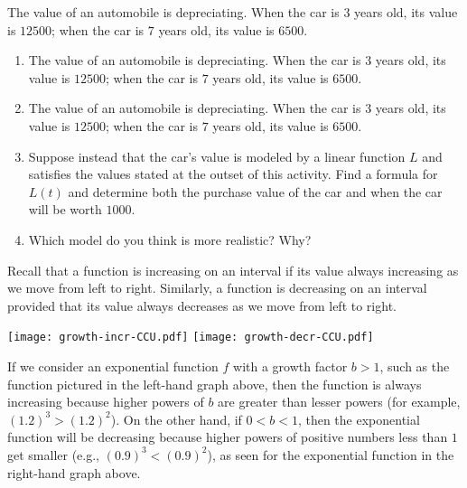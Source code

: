 \documentclass[nooutcomes]{ximera}
\begin{document}
\begin{exploration}
The value of an automobile is depreciating.  When the car is $3$ years old, its value is \textdollar{}$12500$; when the car is $7$ years old, its value is \textdollar{}$6500$.

\begin{enumerate}[label=\alph*.]
\item The value of an automobile is depreciating.  When the car is $3$ years old, its value is \textdollar{}$12500$; when the car is $7$ years old, its value is \textdollar{}$6500$.
\item The value of an automobile is depreciating.  When the car is $3$ years old, its value is \textdollar{}$12500$; when the car is $7$ years old, its value is \textdollar{}$6500$.
\item Suppose instead that the car's value is modeled by a linear function $L$ and satisfies the values stated at the outset of this activity.  Find a formula for $L(t)$ and determine both the purchase value of the car and when the car will be worth \textdollar{}$1000$.
\item Which model do you think is more realistic?  Why?
\end{enumerate}
\end{exploration}


Recall that a function is increasing on an interval if its value always increasing as we move from left to right.  Similarly, a function is decreasing on an interval provided that its value always decreases as we move from left to right.

\begin{image}
\texttt{[image: growth-incr-CCU.pdf]}
\texttt{[image: growth-decr-CCU.pdf]}
\end{image}

If we consider an exponential function $f$ with a growth factor $b > 1$, such as the function pictured in the left-hand graph above, then the function is always increasing because higher powers of $b$ are greater than lesser powers (for example, $(1.2)^3 > (1.2)^2$).  On the other hand, if $0 < b < 1$, then the exponential function will be decreasing because higher powers of positive numbers less than $1$ get smaller (e.g., $(0.9)^3 < (0.9)^2$), as seen for the exponential function in the right-hand graph above.
\end{document}
